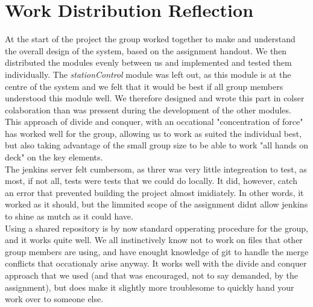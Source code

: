 \section{Work Distribution Reflection}

At the start of the project the group worked together to make and understand the overall design of the system, based on the assignment handout. We then distributed the modules evenly between us and implemented and tested them individually. 
The \textit{stationControl} module was left out, as this module is at the centre of the system and we felt that it would be best if all group members understood this module well. We therefore designed and wrote this part in colser colaboration than was pressent during the development of the other modules.\\

This approach of divide and conquer, with an occational "concentration of force" has worked well for the group, allowing us to work as suited the individual best, but also taking advantage of the small group size to be able to work "all hands on deck" on the key elements.\\

The jenkins server felt cumbersom, as threr was very little integreation to test, as most, if not all, tests were tests that we could do locally. It did, however, catch an error that prevented building the project almost imidiately. In other words, it worked as it should, but the limmited scope of the assignment didnt allow jenkins to shine as mutch as it could have.\\

Using a shared repository is by now standard opperating procedure for the group, and it works quite well. We all instinctively know not to work on files that other group members are using, and have enought knowledge of git to handle the merge conflicts that occationaly arise anyway. It works well with the divide and conquer approach that we used (and that was encouraged, not to say demanded, by the assignment), but does make it slightly more troublesome to quickly hand your work over to someone else.


\newpage